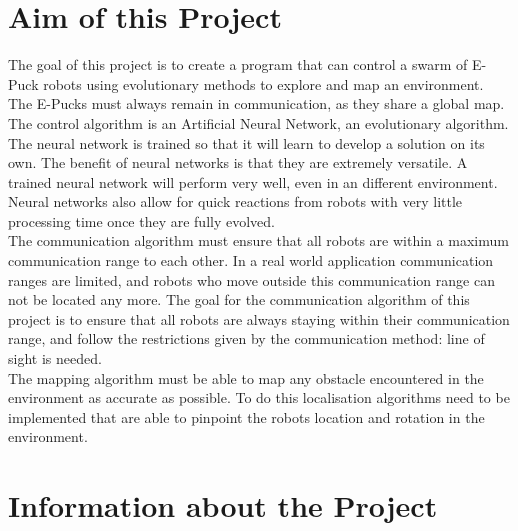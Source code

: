 \section{Aim of this Project}
The goal of this project is to create a program that can control a swarm of E-Puck robots using evolutionary methods to explore and map an environment. 
The E-Pucks must always remain in communication, as they share a global map. 
The control algorithm is an Artificial Neural Network, an evolutionary algorithm. 
The neural network is trained so that it will learn to develop a solution on its own.
The benefit of neural networks is that they are extremely versatile. A trained neural network will perform very well, even in an different environment. Neural networks also allow for quick reactions from robots with very little processing time once they are fully evolved.\\

The communication algorithm must ensure that all robots are within a maximum communication range to each other. In a real world application communication ranges are limited, and robots who move outside this communication range can not be located any more. The goal for the communication algorithm of this project is to ensure that all robots are always staying within their communication range, and follow the restrictions given by the communication method: line of sight is needed.\\

The mapping algorithm must be able to map any obstacle encountered in the environment as accurate as possible. To do this localisation algorithms need to be implemented that are able to pinpoint the robots location and rotation in the environment. 

\section{Information about the Project}
